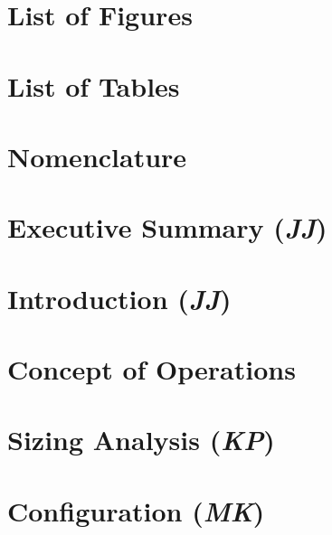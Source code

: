 \documentclass[conf]{new-aiaa}
\begin{document}
\section{List of Figures}
\makeatletter
{}%
\makeatother

\section{List of Tables}
\makeatletter
{}%
\makeatother

\newpage


\section{Nomenclature}


\newpage
\doublespacing


\section{Executive Summary (\textit{JJ})}
\label{section: Exec Summary}


\clearpage
\setcounter{section}{0}
\renewcommand{\thesection}{\Roman{section}}

\section{Introduction (\textit{JJ})}
\label{section: Intro}


\section{Concept of Operations}
\label{section: Conops}


\clearpage
\section{Sizing Analysis (\textit{KP})}
\label{section: Sizing Analysis}


\section{Configuration (\textit{MK})}
\label{section: Configuration}

\end{document}
